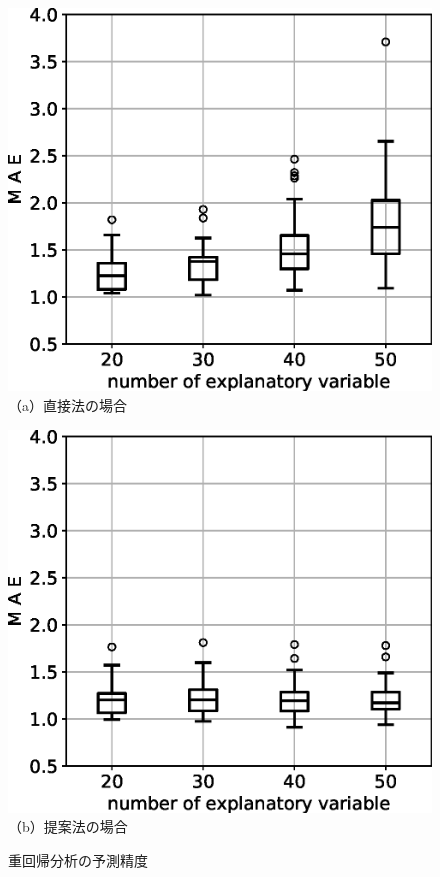 \begin{figure}[t]
 \begin{minipage}{0.49\hsize}
  \begin{center}
   \includegraphics[width=0.93\hsize]{img/plot1_mod.eps}
   	　\small（a）直接法の場合
  \end{center}
 \end{minipage}
 \begin{minipage}{0.49\hsize}
  \begin{center}
   \includegraphics[width=0.93\hsize]{img/plot2_mod.eps}
    \small（b）提案法の場合
  \end{center}
 \end{minipage}
   \caption{重回帰分析の予測精度}
  \label{fig:result1}
\end{figure}